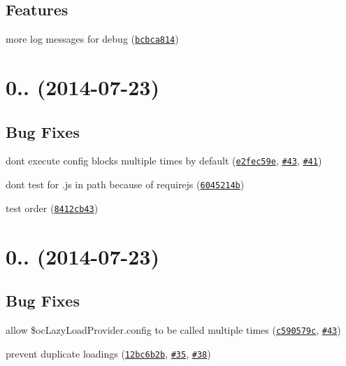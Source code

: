 \subsection*{Features}


\begin{DoxyItemize}
\item more log messages for debug (\href{https://github.com/ocombe/ocLazyLoad/commit/bcbca814049863b4dd7a6c5c1071efd760094966}{\tt bcbca814})
\end{DoxyItemize}

\label{_0.3.3}%
 \section*{0.. (2014-\/07-\/23)}

\subsection*{Bug Fixes}


\begin{DoxyItemize}
\item don\textquotesingle{}t execute config blocks multiple times by default (\href{https://github.com/ocombe/ocLazyLoad/commit/e2fec59ee7ff1e95e7e78ef8397c4fe500d8e7c0}{\tt e2fec59e}, \href{https://github.com/ocombe/ocLazyLoad/issues/43}{\tt \#43}, \href{https://github.com/ocombe/ocLazyLoad/issues/41}{\tt \#41})
\item don\textquotesingle{}t test for .js in path because of requirejs (\href{https://github.com/ocombe/ocLazyLoad/commit/6045214b6a4cc2d9dee1c1f2f89946687d963828}{\tt 6045214b})
\item test order (\href{https://github.com/ocombe/ocLazyLoad/commit/8412cb431bfc742f2c4151e5b089f3313a70035e}{\tt 8412cb43})
\end{DoxyItemize}

\label{_0.3.2}%
 \section*{0.. (2014-\/07-\/23)}

\subsection*{Bug Fixes}


\begin{DoxyItemize}
\item allow \$oc\+Lazy\+Load\+Provider.\+config to be called multiple times (\href{https://github.com/ocombe/ocLazyLoad/commit/c590579c9512e0dd3fae2c33c0aefc0bb0f7ca7e}{\tt c590579c}, \href{https://github.com/ocombe/ocLazyLoad/issues/43}{\tt \#43})
\item prevent duplicate loadings (\href{https://github.com/ocombe/ocLazyLoad/commit/12bc6b2b2d1561517d56c14c56c15c332d578344}{\tt 12bc6b2b}, \href{https://github.com/ocombe/ocLazyLoad/issues/35}{\tt \#35}, \href{https://github.com/ocombe/ocLazyLoad/issues/38}{\tt \#38})
\end{DoxyItemize}

